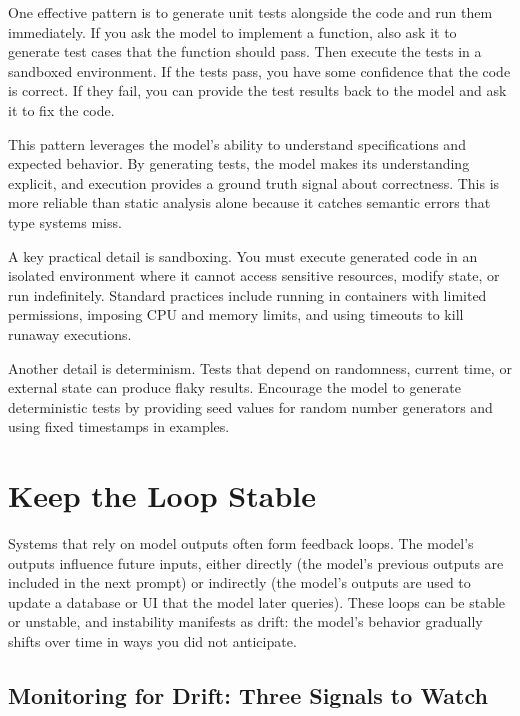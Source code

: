 One effective pattern is to generate unit tests alongside the code and run them immediately. If you ask the model to implement a function, also ask it to generate test cases that the function should pass. Then execute the tests in a sandboxed environment. If the tests pass, you have some confidence that the code is correct. If they fail, you can provide the test results back to the model and ask it to fix the code.

This pattern leverages the model's ability to understand specifications and expected behavior. By generating tests, the model makes its understanding explicit, and execution provides a ground truth signal about correctness. This is more reliable than static analysis alone because it catches semantic errors that type systems miss.

A key practical detail is sandboxing. You must execute generated code in an isolated environment where it cannot access sensitive resources, modify state, or run indefinitely. Standard practices include running in containers with limited permissions, imposing CPU and memory limits, and using timeouts to kill runaway executions.

Another detail is determinism. Tests that depend on randomness, current time, or external state can produce flaky results. Encourage the model to generate deterministic tests by providing seed values for random number generators and using fixed timestamps in examples.

\vspace{2em}

\section{Keep the Loop Stable}

Systems that rely on model outputs often form feedback loops. The model's outputs influence future inputs, either directly (the model's previous outputs are included in the next prompt) or indirectly (the model's outputs are used to update a database or UI that the model later queries). These loops can be stable or unstable, and instability manifests as drift: the model's behavior gradually shifts over time in ways you did not anticipate.

\vspace{1em}

\subsection{Monitoring for Drift: Three Signals to Watch}

